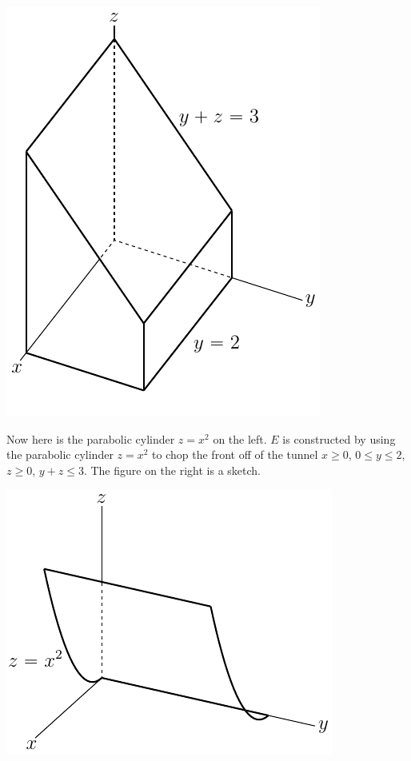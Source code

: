 \begin{solution}
\begin{center}
     \includegraphics[scale=0.7]{fig/OE16D_8c.pdf}
\end{center}
Now here is the parabolic cylinder $z=x^2$ on the left.
$E$ is constructed by using the parabolic cylinder $z=x^2$ to chop the front
off of the tunnel $x\ge 0$, $0\le y\le 2$, $z\ge 0$,  $y+z\le 3$. The figure 
on the right is a sketch.
\begin{center}
     \includegraphics{fig/OE16D_8d.pdf}\qquad

\end{center}
\end{solution}
